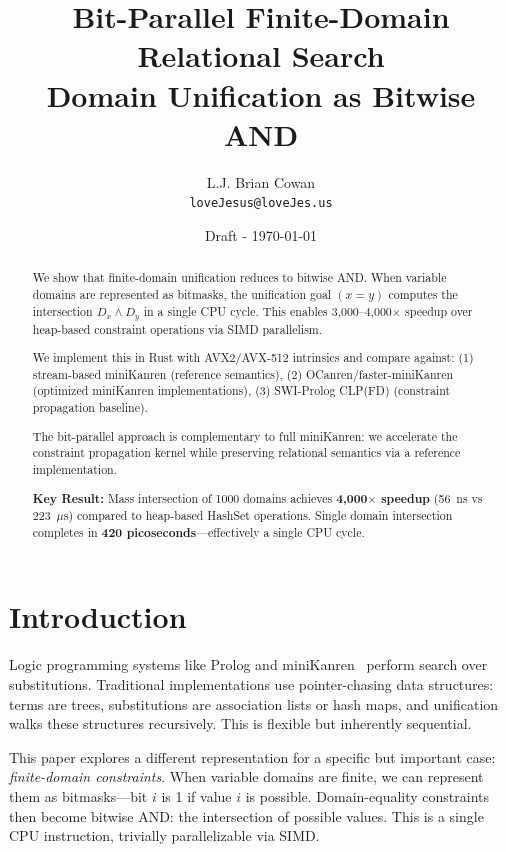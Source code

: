 \documentclass[11pt,a4paper]{article}
\title{Bit-Parallel Finite-Domain Relational Search\\
\large Domain Unification as Bitwise AND}
\author{
  L.J. Brian Cowan \\
  \texttt{loveJesus@loveJes.us}
}
\date{Draft - \today}
\begin{document}
\maketitle

\begin{abstract}
We show that finite-domain unification reduces to bitwise AND.
When variable domains are represented as bitmasks, the unification goal
$(x = y)$ computes the intersection $D_x \land D_y$ in a single CPU cycle.
This enables 3,000--4,000$\times$ speedup over heap-based constraint operations
via SIMD parallelism.

We implement this in Rust with AVX2/AVX-512 intrinsics and compare against:
(1) stream-based miniKanren (reference semantics),
(2) OCanren/faster-miniKanren (optimized miniKanren implementations),
(3) SWI-Prolog CLP(FD) (constraint propagation baseline).

The bit-parallel approach is complementary to full miniKanren:
we accelerate the constraint propagation kernel while preserving
relational semantics via a reference implementation.

\textbf{Key Result:} Mass intersection of 1000 domains achieves
\textbf{4,000$\times$ speedup} (56~ns vs 223~$\mu$s) compared to heap-based HashSet operations.
Single domain intersection completes in \textbf{420 picoseconds}---effectively a single CPU cycle.
\end{abstract}

\section{Introduction}

Logic programming systems like Prolog and miniKanren~\cite{reasoned_schemer_chirho} perform search over substitutions.
Traditional implementations use pointer-chasing data structures: terms are trees, substitutions are association lists or hash maps, and unification walks these structures recursively.
This is flexible but inherently sequential.

This paper explores a different representation for a specific but important case:
\emph{finite-domain constraints}.
When variable domains are finite, we can represent them as bitmasks---bit $i$ is 1 if value $i$ is possible.
Domain-equality constraints then become bitwise AND: the intersection of possible values.
This is a single CPU instruction, trivially parallelizable via SIMD.
\end{document}
